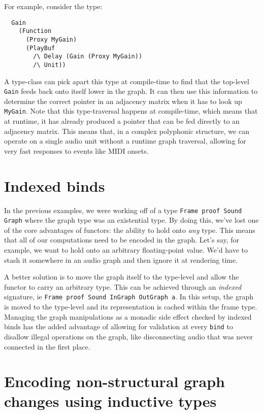 \documentclass{sig-alternate}
\begin{document}
\begin{sloppypar}
  For example, consider the type:

  \begin{verbatim}
  Gain
    (Function 
      (Proxy MyGain) 
      (PlayBuf
        /\ Delay (Gain (Proxy MyGain))
        /\ Unit))
  \end{verbatim}

  A type-class can pick apart this type at compile-time to find that the top-level \verb=Gain= feeds back onto itself lower in the graph. It can then use this information to determine the correct pointer in an adjacency matrix when it has to look up \verb=MyGain=. Note that this type-traversal happens at compile-time, which means that at runtime, it has already produced a pointer that can be fed directly to an adjacency matrix. This means that, in a complex polyphonic structure, we can operate on a single audio unit without a runtime graph traversal, allowing for very fast responses to events like MIDI onsets.

  \section{Indexed binds}

  In the previous examples, we were working off of a type \texttt{Frame proof Sound Graph} where the graph type was an existential type. By doing this, we've lost one of the core advantages of functors: the ability to hold onto \textit{any} type. This means that all of our computations need to be encoded in the graph. Let's say, for example, we want to hold onto an arbitrary floating-point value. We'd have to stash it somewhere in an audio graph and then ignore it at rendering time.

  A better solution is to move the graph itself to the type-level and allow the functor to carry an arbitrary type. This can be achieved through an \textit{indexed} signature, ie \verb=Frame proof Sound InGraph OutGraph a=. In this setup, the graph is moved to the type-level and its representation is cached within the frame type. Managing the graph manipulations as a monadic side effect checked by indexed binds has the added advantage of allowing for validation at every \verb=bind= to disallow illegal operations on the graph, like disconnecting audio that was never connected in the first place.

  \section{Encoding non-structural graph changes using inductive types}


\end{sloppypar}
\end{document}

